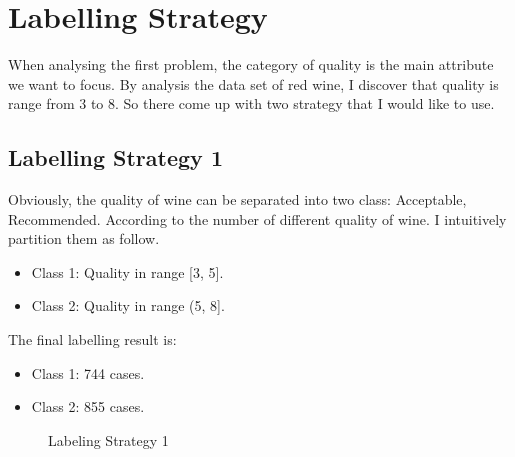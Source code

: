 \documentclass[titlepage,a4paper,12pt,thmsb]{report}
\begin{document}
\section{Labelling Strategy}

When analysing the first problem, the category of quality is the main attribute we want to focus. By analysis the data set of red wine, I discover that quality is range from 3 to 8. So there come up with two strategy that I would like to use.


\newpage

\subsection{Labelling Strategy 1}

Obviously, the quality of wine can be separated into two class: Acceptable, Recommended. According to the number of different quality of wine. I intuitively partition them as follow.

\begin{itemize}
\item{Class 1: Quality in range [3, 5].}
\item{Class 2: Quality in range (5, 8].}
\end{itemize}

The final labelling result is:

\begin{itemize}
\item{Class 1: 744 cases.}
\item{Class 2: 855 cases.}
\end{itemize}

\begin{center}
\begin{figure}[hbtp]
{\par}
\caption{ Labeling Strategy 1}
\end{figure}
{}
\end{center}
\end{document}
